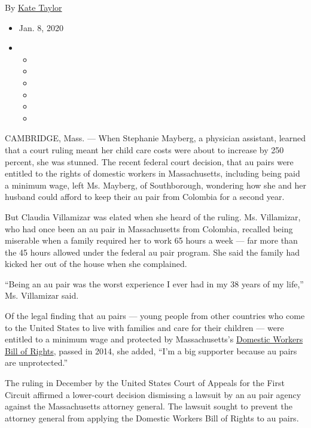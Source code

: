 By \href{https://www.nytimes3xbfgragh.onion/by/kate-taylor}{Kate Taylor}

\begin{itemize}
\item
  Jan. 8, 2020
\item
  \begin{itemize}
  \item
  \item
  \item
  \item
  \item
  \item
  \end{itemize}
\end{itemize}

CAMBRIDGE, Mass. --- When Stephanie Mayberg, a physician assistant,
learned that a court ruling meant her child care costs were about to
increase by 250 percent, she was stunned. The recent federal court
decision, that au pairs were entitled to the rights of domestic workers
in Massachusetts, including being paid a minimum wage, left Ms. Mayberg,
of Southborough, wondering how she and her husband could afford to keep
their au pair from Colombia for a second year.

But Claudia Villamizar was elated when she heard of the ruling. Ms.
Villamizar, who had once been an au pair in Massachusetts from Colombia,
recalled being miserable when a family required her to work 65 hours a
week --- far more than the 45 hours allowed under the federal au pair
program. She said the family had kicked her out of the house when she
complained.

``Being an au pair was the worst experience I ever had in my 38 years of
my life,'' Ms. Villamizar said.

Of the legal finding that au pairs --- young people from other countries
who come to the United States to live with families and care for their
children --- were entitled to a minimum wage and protected by
Massachusetts's
\href{https://malegislature.gov/Laws/SessionLaws/Acts/2014/Chapter148}{Domestic
Workers Bill of Rights}, passed in 2014, she added, ``I'm a big
supporter because au pairs are unprotected.''

The ruling in December by the United States Court of Appeals for the
First Circuit affirmed a lower-court decision dismissing a lawsuit by an
au pair agency against the Massachusetts attorney general. The lawsuit
sought to prevent the attorney general from applying the Domestic
Workers Bill of Rights to au pairs.


